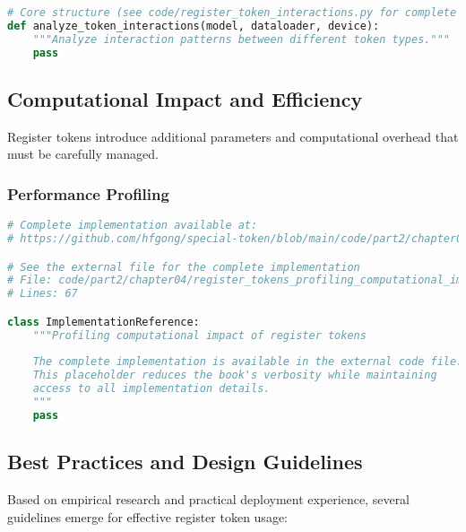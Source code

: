 \begin{lstlisting}[language=Python, caption=Analyzing interactions between register and other tokens]
# Core structure (see code/register_token_interactions.py for complete implementation)
def analyze_token_interactions(model, dataloader, device):
    """Analyze interaction patterns between different token types."""
    pass
\end{lstlisting}

\subsection{Computational Impact and Efficiency}

Register tokens introduce additional parameters and computational overhead that must be carefully managed.

\subsubsection{Performance Profiling}

\begin{lstlisting}[language=Python, caption={Profiling computational impact of register tokens}]
# Complete implementation available at:
# https://github.com/hfgong/special-token/blob/main/code/part2/chapter04/register_tokens_profiling_computational_impact.py

# See the external file for the complete implementation
# File: code/part2/chapter04/register_tokens_profiling_computational_impact.py
# Lines: 67

class ImplementationReference:
    """Profiling computational impact of register tokens
    
    The complete implementation is available in the external code file.
    This placeholder reduces the book's verbosity while maintaining
    access to all implementation details.
    """
    pass
\end{lstlisting}

\subsection{Best Practices and Design Guidelines}

Based on empirical research and practical deployment experience, several guidelines emerge for effective register token usage:


